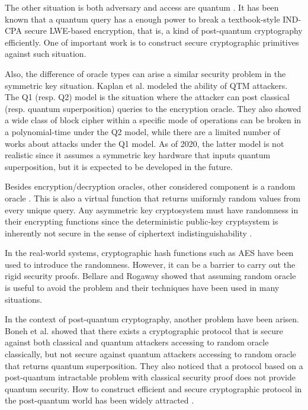 The other situation is both adversary and access are quantum
\cite{KM10,BZCG13,GHS16}.
It has been known \cite{AJOP20} that a quantum query has a enough power 
to break a textbook-style IND-CPA secure LWE-based encryption, that is, 
a kind of post-quantum cryptography efficiently.
One of important work is to construct secure cryptographic primitives 
against such situation.


Also, the difference of oracle types can arise a similar security problem in the symmetric key situation.
Kaplan et al. \cite{KLLN16} modeled the ability of QTM attackers.
The Q1 (resp. Q2) model is the situation where the attacker can post classical (resp. quantum superposition) queries to the encryption oracle.
They also showed a wide class of block cipher  within a specific mode of operations can be broken in a polynomial-time under the Q2 model, 
while there are a limited number of works about attacks under the Q1 model.
As of 2020, the latter model is not realistic since it assumes a symmetric key hardware that inputs quantum superposition, but it is expected to be developed in the future.

Besides encryption/decryption oracles, 
other considered component is a random oracle \cite{BR93}.
This is also a virtual function that returns uniformly random values from every unique query.
Any asymmetric key cryptosystem must have randomness in their encrypting functions since the deterministic public-key cryptsystem is inherently not secure
in the sense of ciphertext indistinguishability \cite[Sect. 5.2.2]{Gol09book}.

In the real-world systems, cryptographic hash functions such as AES have been used to introduce the randomness.
However, it can be a barrier to carry out the rigid security proofs.
Bellare and Rogaway \cite{BR93} showed that assuming random oracle is 
useful to avoid the problem and their techniques have been used in many situations. 

In the context of post-quantum cryptography, 
another problem have been arisen.
Boneh et al. \cite{BDFL+11} showed that 
there exists a cryptographic protocol
that is secure against both classical and quantum attackers accessing to random oracle classically, but not secure against quantum attackers accessing to random oracle that returns quantum superposition.
They also noticed that a protocol based on a post-quantum intractable problem with classical security proof does not provide quantum security.
How to construct efficient and secure cryptographic protocol in the post-quantum world has been widely attracted \cite{JZM19}.

